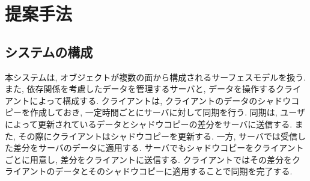 \chapter{提案手法} \label{chap:method}

\section{システムの構成}
本システムは, オブジェクトが複数の面から構成されるサーフェスモデルを扱う.
また, 依存関係を考慮したデータを管理するサーバと, データを操作するクライアントによって構成する.
クライアントは, クライアントのデータのシャドウコピーを作成しておき, 一定時間ごとにサーバに対して同期を行う.
同期は, ユーザによって更新されているデータとシャドウコピーの差分をサーバに送信する.
また, その際にクライアントはシャドウコピーを更新する.
一方, サーバでは受信した差分をサーバのデータに適用する.
サーバでもシャドウコピーをクライアントごとに用意し, 差分をクライアントに送信する.
クライアントではその差分をクライアントのデータとそのシャドウコピーに適用することで同期を完了する.
